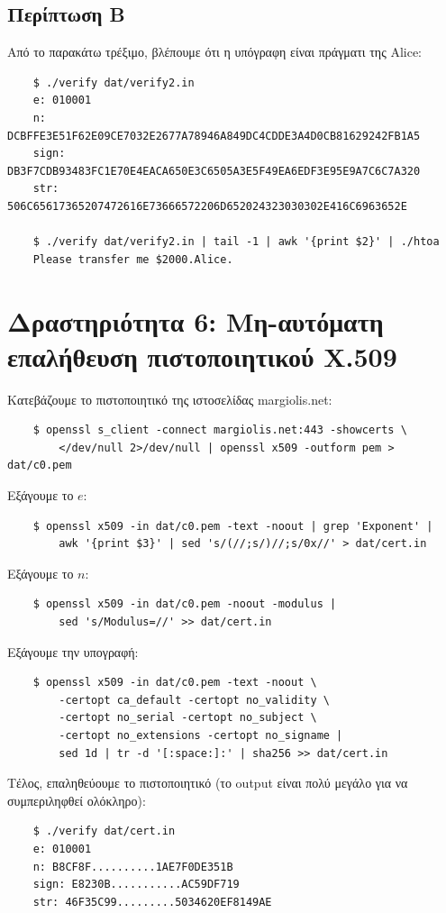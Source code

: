\documentclass[12pt]{article}
\begin{document}
\subsection{Περίπτωση Β}

Από το παρακάτω τρέξιμο, βλέπουμε ότι η υπόγραφη είναι πράγματι της Alice:

\begin{lstlisting}
	$ ./verify dat/verify2.in
	e: 010001
	n: DCBFFE3E51F62E09CE7032E2677A78946A849DC4CDDE3A4D0CB81629242FB1A5
	sign: DB3F7CDB93483FC1E70E4EACA650E3C6505A3E5F49EA6EDF3E95E9A7C6C7A320
	str: 506C65617365207472616E73666572206D652024323030302E416C6963652E

	$ ./verify dat/verify2.in | tail -1 | awk '{print $2}' | ./htoa
	Please transfer me $2000.Alice.
\end{lstlisting}

\section{Δραστηριότητα 6: Μη-αυτόματη επαλήθευση πιστοποιητικού X.509}

Κατεβάζουμε το πιστοποιητικό της ιστοσελίδας margiolis.net:
\begin{lstlisting}
	$ openssl s_client -connect margiolis.net:443 -showcerts \
		</dev/null 2>/dev/null | openssl x509 -outform pem > dat/c0.pem
\end{lstlisting}

Εξάγουμε το $e$:
\begin{lstlisting}
	$ openssl x509 -in dat/c0.pem -text -noout | grep 'Exponent' |
		awk '{print $3}' | sed 's/(//;s/)//;s/0x//' > dat/cert.in
\end{lstlisting}

Εξάγουμε το $n$:
\begin{lstlisting}
	$ openssl x509 -in dat/c0.pem -noout -modulus |
		sed 's/Modulus=//' >> dat/cert.in
\end{lstlisting}

Εξάγουμε την υπογραφή:
\begin{lstlisting}
	$ openssl x509 -in dat/c0.pem -text -noout \
		-certopt ca_default -certopt no_validity \
		-certopt no_serial -certopt no_subject \
		-certopt no_extensions -certopt no_signame |
		sed 1d | tr -d '[:space:]:' | sha256 >> dat/cert.in
\end{lstlisting}

Τέλος, επαληθεύουμε το πιστοποιητικό (το output είναι πολύ μεγάλο για να
συμπεριληφθεί ολόκληρο):
\begin{lstlisting}
	$ ./verify dat/cert.in
	e: 010001
	n: B8CF8F..........1AE7F0DE351B
	sign: E8230B...........AC59DF719
	str: 46F35C99.........5034620EF8149AE
\end{lstlisting}
\end{document}
